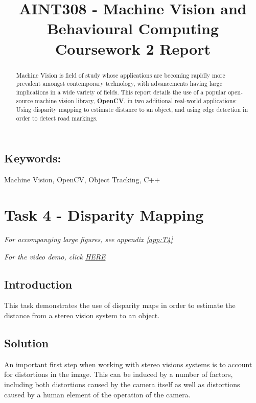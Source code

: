 \documentclass[conference]{IEEEtran}
\begin{document}
%
\title{AINT308 - Machine Vision and Behavioural Computing\\Coursework 2 Report}


\author{
}



\maketitle


\begin{abstract}
 Machine Vision is field of study whose applications are becoming rapidly more prevalent amongst contemporary technology, with advancements having large implications in a wide variety of fields. This report details the use of a popular open-source machine vision library, \textbf{OpenCV}, in two additional real-world applications: Using disparity mapping to estimate distance to an object, and using edge detection in order to detect road markings.
\end{abstract}
\subsection*{Keywords:}
Machine Vision, OpenCV, Object Tracking, C++

\section{Task 4 - Disparity Mapping}
\textit{For accompanying large figures, see appendix \ref{app:T4}}

\textit{For the video demo, click \href{https://youtu.be/kQwU62_2fdQ}{HERE}}
\subsection{Introduction}
This task demonstrates the use of disparity maps in order to estimate the distance from a stereo vision system to an object.
\subsection{Solution}
An important first step when working with stereo visions systems is to account for distortions in the image. This can be induced by a number of factors, including both distortions caused by the camera itself as well as distortions caused by a human element of the operation of the camera\cite{Distortions}.
\end{document}
